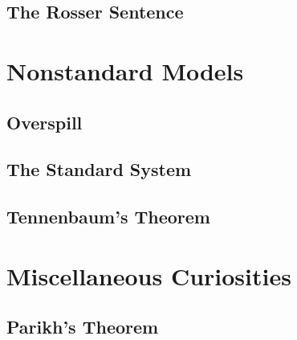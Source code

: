 \documentclass{article}
\theoremstyle{nonumberplain}
\begin{document}
\subsection{The Rosser Sentence}

\section{Nonstandard Models}

\subsection{Overspill}

\subsection{The Standard System}

\subsection{Tennenbaum's Theorem}

\section{Miscellaneous Curiosities}

\subsection{Parikh's Theorem}

%
%
\end{document}
